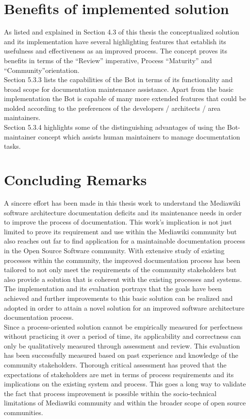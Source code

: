 \section{Benefits of implemented solution} 
\indent As listed and explained in Section 4.3 of this thesis the conceptualized solution and its implementation have several highlighting features that establish its usefulness and effectiveness as an improved process. The concept proves its benefits in terms of the \enquote{Review} imperative, Process \enquote{Maturity} and \enquote{Community}orientation.
\\\indent Section 5.3.3 lists the capabilities of the Bot in terms of its functionality and broad scope for documentation maintenance assistance. Apart from the basic implementation the Bot is capable of many more extended features that could be molded according to the preferences of the developers / architects / area maintainers. 	
\\\indent Section 5.3.4 highlights some of the distinguishing advantages of using the Bot-maintainer concept which assists human maintainers to manage documentation tasks.

\section{Concluding Remarks} 	
\indent A sincere effort has been made in this thesis work to understand the Mediawiki software architecture documentation deficits and its maintenance needs in order to improve the process of documentation. This work's implication is not just limited to prove its requirement and use within the Mediawiki community but also reaches out far to find application for a maintainable documentation process in the Open Source Software community. With extensive study of existing processes within the community, the improved documentation process has been tailored to not only meet the requirements of the community stakeholders but also provide a solution that is coherent with the existing processes and systems. The implementation and its evaluation portrays that the goals have been achieved and further improvements to this basic solution can be realized and adopted in order to attain a novel solution for an improved software architecture documentation process. 
\\\indent Since a process-oriented solution cannot be empirically measured for perfectness without practicing it over a period of time, its applicability and correctness can only be qualitatively measured through assessment and review. This evaluation has been successfully measured based on past experience and knowledge of the community stakeholders. Thorough critical assessment has proved that the expectations of stakeholders are met in terms of process requirements and its implications on the existing system and process. This goes a long way to validate the fact that process improvement is possible within the socio-technical limitations of Mediawiki community and within the broader scope of open source communities.

